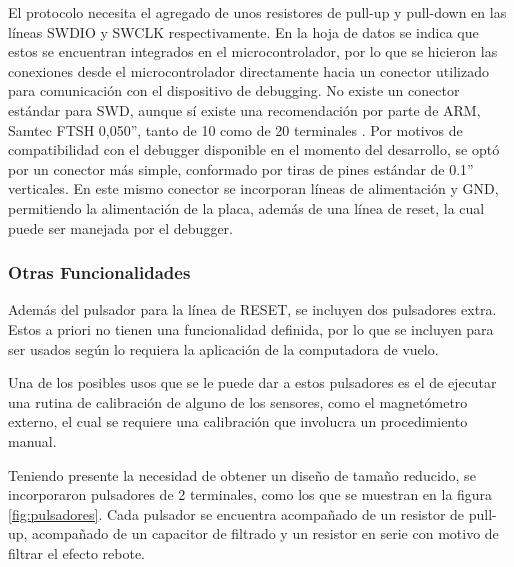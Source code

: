 El protocolo necesita el agregado de unos resistores de pull-up y pull-down en las líneas SWDIO y SWCLK respectivamente. En la hoja de datos se indica que estos se encuentran integrados en el microcontrolador, por lo que se hicieron las conexiones desde el microcontrolador directamente hacia un conector utilizado para comunicación con el dispositivo de debugging. No existe un conector estándar para SWD, aunque sí existe una recomendación por parte de ARM, Samtec FTSH 0,050'', tanto de 10 como de 20 terminales \cite{ARM_SWD_connector}. Por motivos de compatibilidad con el debugger disponible en el momento del desarrollo, se optó por un conector más simple, conformado por tiras de pines estándar de 0.1” verticales. En este mismo conector se incorporan líneas de alimentación y GND, permitiendo la alimentación de la placa, además de una línea de reset, la cual puede ser manejada por el debugger.


\subsubsection{Otras Funcionalidades}

Además del pulsador para la línea de RESET, se incluyen dos pulsadores extra. Estos a priori no tienen una funcionalidad definida, por lo que se incluyen para ser usados según lo requiera la aplicación de la computadora de vuelo.

Una de los posibles usos que se le puede dar a estos pulsadores es el de ejecutar una rutina de calibración de alguno de los sensores, como el magnetómetro externo, el cual se requiere una calibración que involucra un procedimiento manual.

Teniendo presente la necesidad de obtener un diseño de tamaño reducido, se incorporaron pulsadores de 2 terminales, como los que se muestran en la figura \ref{fig:pulsadores}. Cada pulsador se encuentra acompañado de un resistor de pull-up, acompañado de un capacitor de filtrado y un resistor en serie con motivo de filtrar el efecto rebote.

